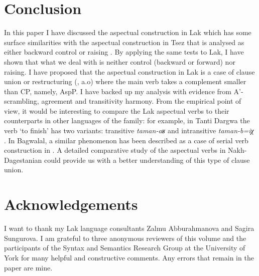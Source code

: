 \documentclass[output=paper]{langscibook}
\begin{document}
\section{Conclusion}
In this paper I have discussed the aspectual construction in Lak which has some surface similarities with the aspectual construction in Tsez that is analysed as either backward control or raising \citep{PolinskyPotsdam2002}. By applying the same tests to Lak, I have shown that what we deal with is neither control (backward or forward) nor raising. I have proposed that the aspectual construction in Lak is a case of clause union or restructuring (\citet{wurmbrand2001,Wurmbrand2004,wurmbrand2015}, a.o) where the main verb takes a complement smaller than CP, namely, AspP. I have backed up my analysis with evidence from A’-scrambling, agreement and transitivity harmony. From the empirical point of view, it would be interesting to compare the Lak aspectual verbs to their counterparts in other languages of the family: for example, in Tanti Dargwa the verb ‘to finish’ has two variants: transitive \textit{taman-aʁ} and intransitive \textit{taman-b=iχ} \citep{SumbatovaLander2014}. In Bagwalal, a similar phenomenon has been described as a case of serial verb construction in \citet[119--125]{Tatevosov2001}. A detailed comparative study of the aspectual verbs in Nakh-Da\-ge\-stan\-ian could provide us with a better understanding of this type of clause union. 


\section*{Acknowledgements}
I want to thank my Lak language consultants Zalmu Abburahmanova and Sagira Sungurova. I am grateful to three anonymous reviewers of this volume and the participants of the Syntax and Semantics Research Group at the University of York for many helpful and constructive comments. Any errors that remain in the paper are mine.
\end{document}
